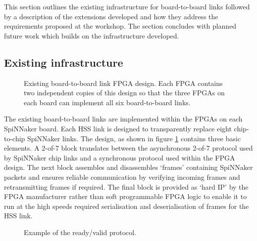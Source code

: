 		This section outlines the existing infrastructure for board-to-board links
		followed by a description of the extensions developed and how they address
		the requirements proposed at the workshop. The section concludes with
		planned future work which builds on the infrastructure developed.
		
			\subsection{Existing infrastructure}
				
				
				\begin{figure}
					\center
					
					
					\caption[Existing board-to-board link FPGA design.]{Existing
					board-to-board link FPGA design. Each FPGA contains two independent
					copies of this design so that the three FPGAs on each board can
					implement all six board-to-board links.}
					\label{fig:existing-fpga-links}
				\end{figure}
				
				The existing board-to-board links are implemented within the FPGAs on
				each SpiNNaker board. Each HSS link is designed to transparently replace
				eight chip-to-chip SpiNNaker links. The design, as shown in figure
				\ref{fig:existing-fpga-links} contains three basic elements. A 2-of-7
				block translates between the asynchronous 2-of-7 protocol used by
				SpiNNaker chip links and a synchronous protocol used within the FPGA
				design. The next block assembles and disassembles `frames' containing
				SpiNNaker packets and ensures reliable communication by verifying
				incoming frames and retransmitting frames if required. The final block
				is provided as `hard IP' by the FPGA manufacturer rather than soft
				programmable FPGA logic to enable it to run at the high speeds required
				serialisation and deserialisation of frames for the HSS link.
				
				\begin{figure}
					\center
					\begin{tikzpicture}[thick]
						
					\end{tikzpicture}
					
					\caption{Example of the ready/valid protocol.}
					\label{fig:rdyvld-protocol}
				\end{figure}
				
